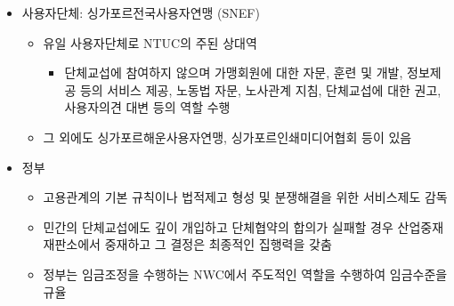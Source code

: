 \documentclass[aspectratio=169,xcolor=dvipsnames,handout]{beamer}
\begin{document}
\begin{frame}[allowframebreaks]
\begin{itemize}[<+->]
\begin{itemize}
        \end{itemize}
    \framebreak%
        \item 사용자단체: 싱가포르전국사용자연맹 (SNEF) 
        \begin{itemize}
            \item 유일 사용자단체로 NTUC의 주된 상대역
            \begin{itemize}
                \item 단체교섭에 참여하지 않으며 가맹회원에 대한 자문, 훈련 및 개발, 정보제공 등의 서비스 제공, 노동법 자문, 노사관계 지침, 단체교섭에 대한 권고, 사용자의견 대변 등의 역할 수행
            \end{itemize}
            \item 그 외에도 싱가포르해운사용자연맹, 싱가포르인쇄미디어협회 등이 있음
        \end{itemize}
        \item 정부
        \begin{itemize}
            \item 고용관계의 기본 규칙이나 법적제고 형성 및 분쟁해결을 위한 서비스제도 감독
            \item 민간의 단체교섭에도 깊이 개입하고 단체협약의 합의가 실패할 경우 산업중재재판소에서 중재하고 그 결정은 최종적인 집행력을 갖춤
            \item 정부는 임금조정을 수행하는 NWC에서 주도적인 역할을 수행하여 임금수준을 규율
        \end{itemize}
    \end{itemize}
\end{frame}
\end{document}
